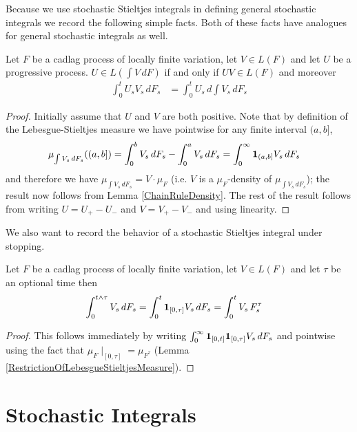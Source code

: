 Because we use stochastic Stieltjes integrals in defining general stochastic integrals we record the following simple facts.  Both of these facts have analogues for general stochastic integrals as well.
\begin{lem}\label{ChainRuleStieltjes}Let $F$ be a cadlag process of locally finite variation, let $V \in L(F)$ and let $U$ be a progressive process.  $U \in L(\int V \, dF)$ if and only if $UV \in L(F)$ and moreover
\begin{align*}
\int_0^t U_s V_s \, dF_s &= \int_0^t U_s \, d\int V_s \, dF_s
\end{align*}
\end{lem}
\begin{proof}
Initially assume that $U$ and $V$ are both positive.  Note that by definition of the Lebesgue-Stieltjes measure we have pointwise for any finite interval $(a,b]$,
\begin{align*}
\mu_{\int V_s \, dF_s}((a,b]) &= \int_0^b V_s \, dF_s - \int_0^a V_s \, dF_s = \int_0^\infty \textbf{1}_{(a,b]} V_s \, dF_s
\end{align*}
and therefore we have $\mu_{\int V_s \, dF_s} = V \cdot \mu_F$ (i.e. $V$ is a $\mu_F$-density of $\mu_{\int V_s \, dF_s}$); the result now follows from Lemma \ref{ChainRuleDensity}.  The rest of the result follows from writing $U = U_+ - U_-$ and $V = V_+ - V_-$ and using linearity.
\end{proof}

We also want to record the behavior of a stochastic Stieltjes integral under stopping.
\begin{lem}\label{StoppingStieltjes}Let $F$ be a cadlag process of locally finite variation, let $V \in L(F)$ and let $\tau$ be an optional time then
\begin{align*}
\int_0^{t \wedge \tau} V_s \, dF_s &= \int_0^t \textbf{1}_{[0,\tau]} V_s \, dF_s = \int_0^t V_s \, F^{\tau}_s
\end{align*}
\end{lem}
\begin{proof}
This follows immediately by writing $\int_0^\infty \textbf{1}_{[0,t]} \textbf{1}_{[0,\tau]} V_s \, dF_s$ and pointwise using the fact that $\mu_F \mid_{[0, \tau]} = \mu_{F^\tau}$ (Lemma \ref{RestrictionOfLebesgueStieltjesMeasure}).
\end{proof}

\section{Stochastic Integrals}

